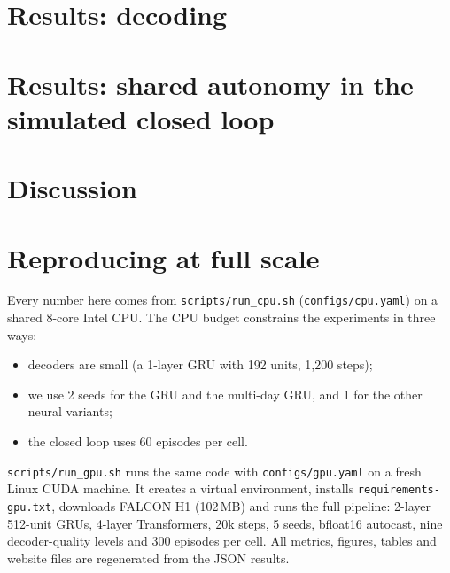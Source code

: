 \section{Results: decoding}\label{sec:dec-results}


\section{Results: shared autonomy in the simulated closed loop}


\section{Discussion}


\section{Reproducing at full scale}\label{sec:repro}
Every number here comes from \texttt{scripts/run\_cpu.sh} (\texttt{configs/cpu.yaml})
on a shared 8-core Intel CPU. The CPU budget constrains the experiments in three ways:
\begin{itemize}
\item decoders are small (a 1-layer GRU with 192 units, 1{,}200 steps);
\item we use 2 seeds for the GRU and the multi-day GRU, and 1 for the other neural
  variants;
\item the closed loop uses 60 episodes per cell.
\end{itemize}
\texttt{scripts/run\_gpu.sh} runs the same code with \texttt{configs/gpu.yaml} on a
fresh Linux CUDA machine. It creates a virtual environment, installs
\texttt{requirements-gpu.txt}, downloads FALCON H1 (102\,MB) and runs the full
pipeline: 2-layer 512-unit GRUs, 4-layer Transformers, 20k steps, 5 seeds, bfloat16
autocast, nine decoder-quality levels and 300 episodes per cell. All metrics,
figures, tables and website files are regenerated from the JSON results.


